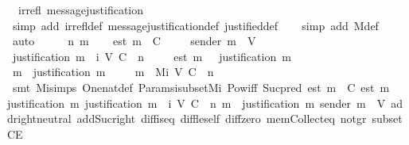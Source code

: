 \begin{isabellebody}
\ \ {\isachardoublequoteopen}irrefl\ message{\isacharunderscore}justification{\isachardoublequoteclose}\isanewline
%
\isadelimproof
\ \ %
\endisadelimproof
%
\isatagproof
{}\isamarkupfalse%
\ {\isacharparenleft}simp\ add{\isacharcolon}\ irrefl{\isacharunderscore}def\ message{\isacharunderscore}justification{\isacharunderscore}def\ justified{\isacharunderscore}def{\isacharparenright}\isanewline
\ \ \isamarkupfalse%
\ {\isacharparenleft}simp\ add{\isacharcolon}\ M{\isacharunderscore}def{\isacharparenright}\isanewline
\ \ \isamarkupfalse%
\ auto\isanewline
{}\isamarkupfalse%
\ {\isacharminus}\isanewline
\ \ \isamarkupfalse%
\ n\ m\isanewline
\ \ \isamarkupfalse%
\ {\isachardoublequoteopen}est\ m\ {\isasymin}\ C{\isachardoublequoteclose}\ \isanewline
\ \ \isamarkupfalse%
\ {\isachardoublequoteopen}sender\ m\ {\isasymin}\ V{\isachardoublequoteclose}\isanewline
\ \ \isamarkupfalse%
\ {\isachardoublequoteopen}justification\ m\ {\isasymin}\ {\isasymSigma}i\ {\isacharparenleft}V{\isacharcomma}\ C{\isacharcomma}\ {\isasymepsilon}{\isacharparenright}\ n{\isachardoublequoteclose}\ \isanewline
\ \ \isamarkupfalse%
\ {\isachardoublequoteopen}est\ m\ {\isasymin}\ {\isasymepsilon}\ {\isacharparenleft}justification\ m{\isacharparenright}{\isachardoublequoteclose}\ \isanewline
\ \ \isamarkupfalse%
\ {\isachardoublequoteopen}m\ {\isasymin}\ justification\ m{\isachardoublequoteclose}\isanewline
\ \ \isamarkupfalse%
\ \ {\isachardoublequoteopen}m\ {\isasymin}\ Mi\ {\isacharparenleft}V{\isacharcomma}\ C{\isacharcomma}\ {\isasymepsilon}{\isacharparenright}\ {\isacharparenleft}n\ {\isacharminus}\ {}{\isacharparenright}{\isachardoublequoteclose}\isanewline
\ \ \ \ \isamarkupfalse%
\ {\isacharparenleft}smt\ Mi{\isachardot}simps\ One{\isacharunderscore}nat{\isacharunderscore}def\ Params{\isachardot}{\isasymSigma}i{\isacharunderscore}subset{\isacharunderscore}Mi\ Pow{\isacharunderscore}iff\ Suc{\isacharunderscore}pred\ {\isacartoucheopen}est\ m\ {\isasymin}\ C{\isacartoucheclose}\ {\isacartoucheopen}est\ m\ {\isasymin}\ {\isasymepsilon}\ {\isacharparenleft}justification\ m{\isacharparenright}{\isacartoucheclose}\ {\isacartoucheopen}justification\ m\ {\isasymin}\ {\isasymSigma}i\ {\isacharparenleft}V{\isacharcomma}\ C{\isacharcomma}\ {\isasymepsilon}{\isacharparenright}\ n{\isacartoucheclose}\ {\isacartoucheopen}m\ {\isasymin}\ justification\ m{\isacartoucheclose}\ {\isacartoucheopen}sender\ m\ {\isasymin}\ V{\isacartoucheclose}\ add{\isachardot}right{\isacharunderscore}neutral\ add{\isacharunderscore}Suc{\isacharunderscore}right\ diff{\isacharunderscore}is{\isacharunderscore}{}{\isacharunderscore}eq{\isacharprime}\ diff{\isacharunderscore}le{\isacharunderscore}self\ diff{\isacharunderscore}zero\ mem{\isacharunderscore}Collect{\isacharunderscore}eq\ not{\isacharunderscore}gr{}\ subsetCE{\isacharparenright}\isanewline

\end{isabellebody}
